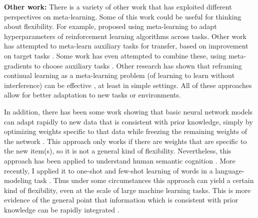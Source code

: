 \textbf{Other work:} There is a variety of other work that has exploited different perspectives on meta-learning. Some of this work could be useful for thinking about flexibility. For example, \citet{Xu2018} proposed using meta-learning to adapt hyperparameters of reinforcement learning algorithms across tasks. Other work has attempted to meta-learn auxiliary tasks for transfer, based on improvement on target tasks \citep{Liu2019a}. Some work has even attempted to combine these, using meta-gradients to choose auxiliary tasks \citep{Veeriah2019}. Other research has shown that reframing continual learning as a meta-learning problem (of learning to learn without interference) can be effective \citep{Velez2017}, at least in simple settings. All of these approaches allow for better adaptation to new tasks or environments. \par
In addition, there has been some work showing that basic neural network models can adapt rapidly to new data that is consistent with prior knowledge, simply by optimizing weights specific to that data while freezing the remaining weights of the network \citep{Rumelhart1993}. This approach only works if there are weights that are specific to the new item(s), so it is not a general kind of flexibility. Nevertheless, this approach has been applied to understand human semantic cognition \citep{Rogers2004}. More recently, I applied it to one-shot and few-shot learning of words in a language-modeling task \citep{Lampinen2018a}. Thus under some circumstances this approach can yield a certain kind of flexibility, even at the scale of large machine learning tasks. This is more evidence of the general point that information which is consistent with prior knowledge can be rapidly integrated \citep{McClelland2013, McClelland2020}. \par 

